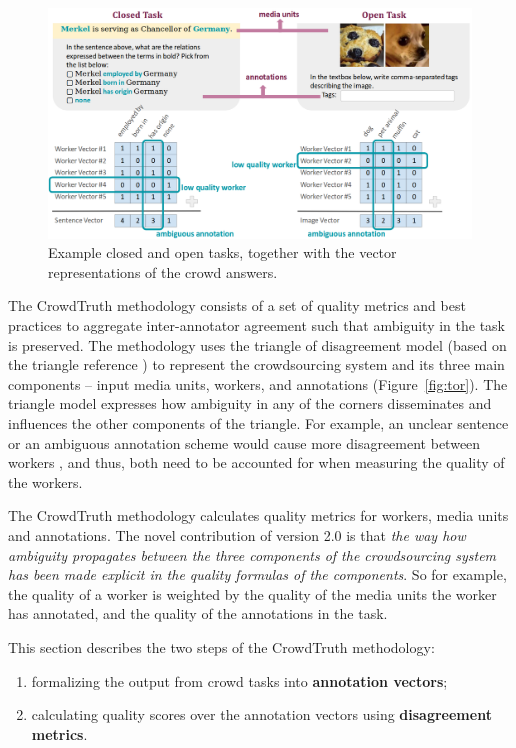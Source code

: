 \begin{figure}[!htb]
 	\centering
 	\includegraphics[width=\linewidth]{img/closed_open_task.png}
 	\caption{Example closed and open tasks, together with the vector representations of the crowd answers.}
 	\label{fig:tasks}
 \end{figure}

The CrowdTruth methodology consists of a set of quality metrics and best practices to aggregate inter-annotator agreement such that ambiguity in the task is preserved. The methodology uses the triangle of disagreement model (based on the triangle reference \cite{knowlton1966definition}) to represent the crowdsourcing system and its three main components -- input media units, workers, and annotations (Figure~\ref{fig:tor}). The triangle model expresses how ambiguity in any of the corners disseminates and influences the other components of the triangle. For example, an unclear sentence or an ambiguous annotation scheme would cause more disagreement between workers \cite{aroyo2014threesides}, and thus, both need to be accounted for when measuring the quality of the workers.

The CrowdTruth methodology calculates quality metrics for workers, media units and annotations. The novel contribution of version 2.0 is that \textit{the way how ambiguity propagates between the three components of the crowdsourcing system has been made explicit in the quality formulas of the components}. So for example, the quality of a worker is weighted by the quality of the media units the worker has annotated, and the quality of the annotations in the task.

This section describes the two steps of the CrowdTruth methodology:
\begin{enumerate}
\item formalizing the output from crowd tasks into \textbf{annotation vectors};
\item calculating quality scores over the annotation vectors using \textbf{disagreement metrics}.
\end{enumerate}

